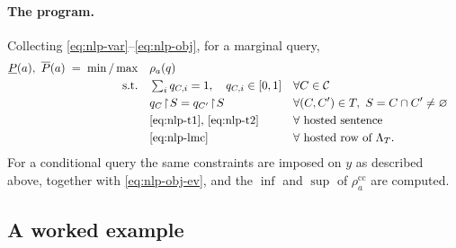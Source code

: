 \documentclass{article} %
\newcommand{\lo}{\underline}
\newcommand{\hi}{\overline}
\newcommand{\restr}{\!\restriction\!}
\newcommand{\readoff}{\rho}
\providecommand{\readoffcc}{\readoff^{\mathrm{cc}}}
\begin{document}
\paragraph{The program.}
Collecting \eqref{eq:nlp-var}--\eqref{eq:nlp-obj}, for a marginal query,
\begin{equation}\label{eq:nlp-all}
\begin{aligned}
\lo P(a),\ \hi P(a)\;=\;\min/\max\quad &\readoff_a(q)\\
\text{s.t.}\quad
&\textstyle\sum_i q_{C,i}=1,\quad q_{C,i}\in[0,1] && \forall C\in\mathcal C\\
&q_C\restr S=q_{C'}\restr S && \forall (C,C')\in T,\ S=C\cap C'\ne\varnothing\\
&\text{\eqref{eq:nlp-t1}, \eqref{eq:nlp-t2}} && \forall\text{ hosted sentence}\\
&\text{\eqref{eq:nlp-lmc}} && \forall\text{ hosted row of }\Lambda_T.
\end{aligned}
\end{equation}
For a conditional query the same constraints are imposed on $y$ as described
above, together with \eqref{eq:nlp-obj-ev}, and the $\inf$ and $\sup$ of
$\readoffcc_a$ are computed.

\subsection{A worked example}\label{sec:cjt-example}
\end{document}
